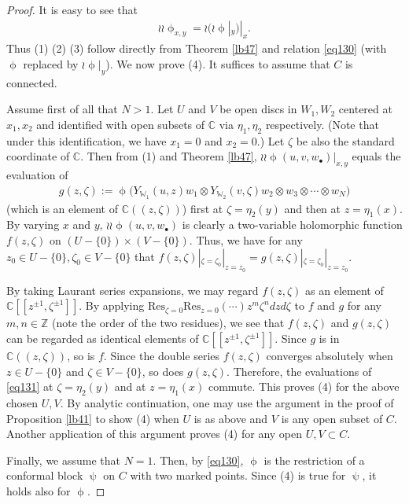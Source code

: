 \documentclass[12pt,b5paper,notitlepage]{report}
\theoremstyle{definition}
\theoremstyle{plain}
\newcommand{\Res}{\mathrm{Res}}
\newcommand{\blt}{\bullet}
\newcommand{\Wbb}{\mathbb W}
\newcommand{\Cbb}{\mathbb C}
\newcommand{\Zbb}{\mathbb Z}
\numberwithin{equation}{section}
\begin{document}
\begin{proof}
It is easy to see that
\begin{align}
\wr\wr\upphi_{x,y}=\wr(\wr\upphi|_y)|_x.
\end{align}
Thus (1) (2) (3) follow directly from Theorem \ref{lb47} and relation \eqref{eq130} (with $\upphi$ replaced by $\wr\upphi|_y$). We now prove (4). It suffices to assume that $C$ is connected.

Assume first of all that $N>1$. Let $U$ and $V$ be open discs in $W_1,W_2$ centered at $x_1,x_2$ and identified with open subsets of $\Cbb$ via $\eta_1,\eta_2$ respectively. (Note that under this identification, we have $x_1=0$ and $x_2=0$.) Let $\zeta$ be also the standard coordinate of $\Cbb$. Then from (1) and Theorem \ref{lb47}, $\wr\wr\upphi(u,v,w_\blt)\big|_{x,y}$ equals the evaluation of 
\begin{align}
g(z,\zeta):=\upphi\big(Y_{\Wbb_1}(u,z)w_1\otimes Y_{\Wbb_2}(v,\zeta)w_2\otimes w_3\otimes\cdots\otimes w_N\big)\label{eq131}
\end{align}
(which is an element of $\Cbb((z,\zeta))$) first at $\zeta=\eta_2(y)$ and then at $z=\eta_1(x)$. By varying $x$ and $y$, $\wr\wr\upphi(u,v,w_\blt)$ is clearly a two-variable holomorphic function $f(z,\zeta)$ on $(U-\{0\})\times (V-\{0\})$. Thus, we have for any $z_0\in U-\{0\},\zeta_0\in V-\{0\}$ that $f(z,\zeta)|_{\zeta=\zeta_0}|_{z=z_0}=g(z,\zeta)|_{\zeta=\zeta_0}|_{z=z_0}$.

By taking Laurant series expansions, we may regard $f(z,\zeta)$ as an element of $\Cbb[[z^{\pm 1},\zeta^{\pm 1}]]$.  By applying $\Res_{\zeta=0}\Res_{z=0}(\cdots)z^m\zeta^ndzd\zeta$ to $f$ and $g$ for any $m,n\in\Zbb$ (note the order of the two residues), we see that $f(z,\zeta)$ and $g(z,\zeta)$ can be regarded as identical elements of $\Cbb[[z^{\pm 1},\zeta^{\pm1}]]$. Since $g$ is in $\Cbb((z,\zeta))$, so is $f$. Since the double series $f(z,\zeta)$  converges absolutely when $z\in U-\{0\}$ and $\zeta\in V-\{0\}$, so does $g(z,\zeta)$. Therefore, the evaluations of \eqref{eq131} at $\zeta=\eta_2(y)$ and at $z=\eta_1(x)$ commute. This proves (4) for the above chosen $U,V$. By analytic continuation, one may use the argument in the proof of Proposition \ref{lb41} to show (4) when $U$ is as above and $V$ is any open subset of $C$. Another application of this argument proves (4) for any open $U,V\subset C$.

Finally, we assume that $N=1$. Then, by \eqref{eq130}, $\upphi$ is the restriction of a conformal block $\uppsi$ on $C$ with two marked points. Since (4) is true for $\uppsi$, it holds also for $\upphi$.
\end{proof}
\end{document}
